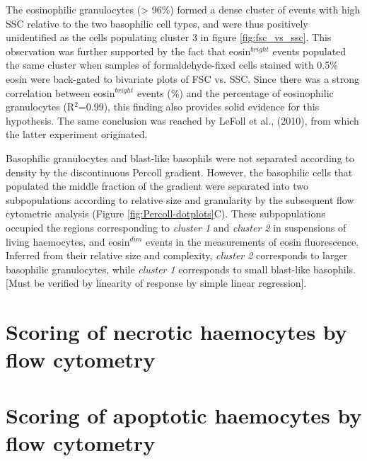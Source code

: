 The eosinophilic granulocytes (> 96\%) formed a dense cluster of events with high SSC relative to the two basophilic cell types, and were thus positively unidentified as the cells populating cluster 3 in figure \ref{fig:fsc_vs_ssc}. This observation was further supported by the fact that eosin$^{bright}$ events populated the same cluster when samples of formaldehyde-fixed cells stained with 0.5\% eosin were back-gated to bivariate plots of FSC vs. SSC. Since there was a strong correlation between eosin$^{bright}$ events (\%) and the percentage of eosinophilic granulocytes (R$^{2}$=0.99), this finding also provides solid evidence for this hypothesis. The same conclusion was reached by LeFoll et al., (2010), from which the latter experiment originated.

Basophilic granulocytes and blast-like basophils were not separated according to density by the discontinuous Percoll gradient. However, the basophilic cells that populated the middle fraction of the gradient were separated into two subpopulations according to relative size and granularity by the subsequent flow cytometric analysis (Figure \ref{fig:Percoll-dotplots}C). These subpopulations occupied the regions corresponding to \emph{cluster 1} and \emph{cluster 2} in suspensions of living haemocytes, and eosin$^{dim}$ events in the measurements of eosin fluorescence. Inferred from their relative size and complexity, \emph{cluster 2} corresponds to larger basophilic granulocytes, while \emph{cluster 1} corresponds to small blast-like basophils. [Must be verified by linearity of response by simple linear regression].

\section{Scoring of necrotic haemocytes by flow cytometry}






\section{Scoring of apoptotic haemocytes by flow cytometry}
